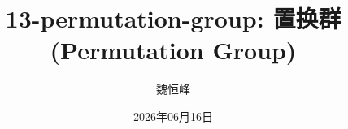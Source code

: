 \documentclass[]{beamer}
\title[13-permutation-group: 置换群]{13-permutation-group: 置换群 (Permutation Group)}
\author[魏恒峰]{\large 魏恒峰}
\institute{hfwei@hnu.edu.cn}
\date{2026年06月16日}
\begin{document}
\maketitle



\thankyou{}

\end{document}
